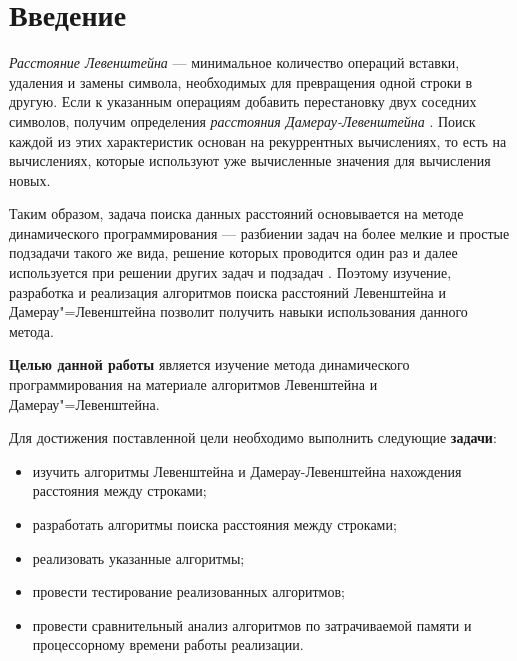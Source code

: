 \chapter*{Введение}

\textit{Расстояние Левенштейна} --- минимальное количество операций вставки,
удаления и замены символа, необходимых для превращения одной строки в другую.
Если к указанным операциям добавить перестановку двух соседних символов,
получим определения \textit{расстояния Дамерау-Левенштейна} \cite{bib01}. Поиск
каждой из этих характеристик основан на рекуррентных вычислениях, то есть на
вычислениях, которые используют уже вычисленные значения для вычисления новых.

Таким образом, задача поиска данных расстояний основывается на методе
динамического программирования --- разбиении задач на более мелкие и простые
подзадачи такого же вида, решение которых проводится один раз и далее
используется при решении других задач и подзадач \cite{bib02}. Поэтому изучение,
разработка и реализация алгоритмов поиска расстояний Левенштейна и
Дамерау"=Левенштейна позволит получить навыки использования данного метода.

\textbf{Целью данной работы} является изучение метода динамического
программирования на материале алгоритмов Левенштейна и Дамерау"=Левенштейна. 

Для достижения поставленной цели необходимо выполнить следующие
\textbf{задачи}:
\begin{itemize}[left=\parindent]
    \item изучить алгоритмы Левенштейна и Дамерау-Левенштейна нахождения
          расстояния между строками;
    \item разработать алгоритмы поиска расстояния между строками;
    \item реализовать указанные алгоритмы;
    \item провести тестирование реализованных алгоритмов;
    \item провести сравнительный анализ алгоритмов по затрачиваемой памяти и
          процессорному времени работы реализации.
\end{itemize}
